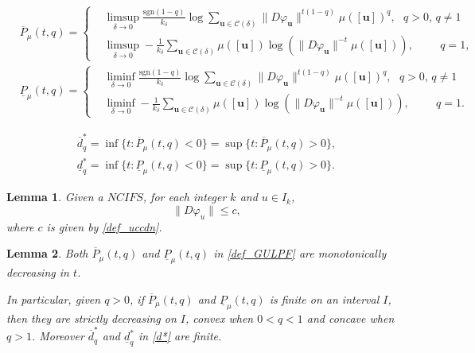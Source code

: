 \documentclass[10pt,a4paper]{amsart}
\newtheorem{lem}{Lemma}
\newcommand{\bu}{\mathbf{u}}
\begin{document}
\begin{equation}\label{def_GULPF}
\begin{split}
&\overline P_\mu(t, q)=\left\{ \begin{aligned} &\limsup_{\delta\to 0} \frac{\mathrm{sgn}(1-q)}{k_{\delta}}\log \sum_{\mathbf{u}\in\mathcal{C}(\delta)}\|D\varphi_\mathbf{u}\|^{t(1-q)}\mu([\bu])^q ,  \textit{  $q>0$, $q\not=1$}   \\
&\limsup_{\delta\to 0} -\frac{1}{k_{\delta}} \sum_{\mathbf{u}\in\mathcal{C}(\delta)}\mu([\bu])\log(\|D\varphi_\mathbf{u}\|^{-t}\mu([\bu])), \hspace{1cm}q=1,
\end{aligned} \right.   \\
&\underline P_\mu(t, q)=\left\{ \begin{aligned} & \liminf_{\delta\to 0} \frac{\mathrm{sgn}(1-q)}{k_{\delta}}\log \sum_{\mathbf{u}\in\mathcal{C}(\delta)}\|D\varphi_\mathbf{u}\|^{t(1-q)}\mu([\bu])^q ,  \textit{  $q>0$, $q\not=1$}   \\
&\liminf_{\delta\to 0} -\frac{1}{k_{\delta}} \sum_{\mathbf{u}\in\mathcal{C}(\delta)}\mu([\bu])\log(\|D\varphi_\mathbf{u}\|^{-t}\mu([\bu])), \hspace{1cm} q=1.
\end{aligned} \right.
\end{split}
\end{equation}    

\begin{equation}\label{d*}
\begin{split}
\overline{d}_q^*=\inf\{t:\overline P_\mu(t, q)<0\}=\sup\{t:\overline P_\mu(t, q)>0\},  \\
\underline{d}_q^*=\inf\{t:\underline P_\mu(t, q)<0\}=\sup\{t:\underline P_\mu(t, q)>0\}.
\end{split}
\end{equation}             

\begin{lem}\label{u contraction}
Given a $NCIFS$, for each integer $k$ and $u\in I_k$, 
$$
\|D\varphi_u\|\le c,
$$
where $c$ is given by \eqref{def_uccdn}.
\end{lem}

\begin{lem}\label{m d}
Both  $\overline P_\mu(t, q)$ and  $\underline P_\mu(t, q)$  in \eqref{def_GULPF} are  monotonically  decreasing  in $t$. 

In particular, given $q>0$,   if $\overline P_\mu(t, q)$ and  $\underline P_\mu(t, q)$ is finite on an  interval $I$, then they are strictly decreasing on $I$,  convex  when $0<q<1$ and  concave   when $q>1$. Moreover $\overline{d}_q^*$ and $\underline{d}_q^*$ in \eqref{d*} are finite. 
\end{lem}
\end{document}
